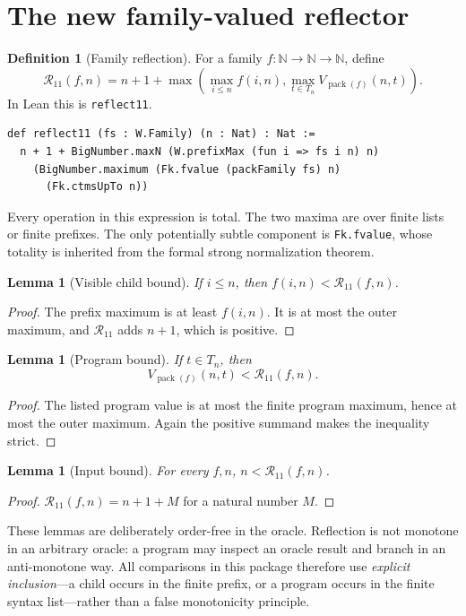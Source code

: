 \documentclass[11pt]{article}
\newtheorem{lemma}[theorem]{Lemma}
\theoremstyle{definition}
\newtheorem{definition}[theorem]{Definition}
\theoremstyle{remark}
\newcommand{\N}{\mathbb{N}}
\newcommand{\code}[1]{\texttt{#1}}
\newcommand{\R}{\mathcal{R}_{11}}
\begin{document}
\section{The new family-valued reflector}

\begin{definition}[Family reflection]
For a family $f:\N\to\N\to\N$, define
\[
  \R(f,n)=n+1+
  \max\left(
    \max_{i\le n} f(i,n),
    \max_{t\in T_n} V_{\operatorname{pack}(f)}(n,t)
  \right).
\]
In Lean this is \code{reflect11}.
\end{definition}

\begin{lstlisting}
def reflect11 (fs : W.Family) (n : Nat) : Nat :=
  n + 1 + BigNumber.maxN (W.prefixMax (fun i => fs i n) n)
    (BigNumber.maximum (Fk.fvalue (packFamily fs) n)
      (Fk.ctmsUpTo n))
\end{lstlisting}

Every operation in this expression is total.  The two maxima are over finite
lists or finite prefixes.  The only potentially subtle component is
\code{Fk.fvalue}, whose totality is inherited from the formal strong
normalization theorem.

\begin{lemma}[Visible child bound]
If $i\le n$, then $f(i,n)<\R(f,n)$.
\end{lemma}
\begin{proof}
The prefix maximum is at least $f(i,n)$.  It is at most the outer maximum, and
$\R$ adds $n+1$, which is positive.
\end{proof}

\begin{lemma}[Program bound]
If $t\in T_n$, then
\[
  V_{\operatorname{pack}(f)}(n,t)<\R(f,n).
\]
\end{lemma}
\begin{proof}
The listed program value is at most the finite program maximum, hence at most
the outer maximum.  Again the positive summand makes the inequality strict.
\end{proof}

\begin{lemma}[Input bound]
For every $f,n$, $n<\R(f,n)$.
\end{lemma}
\begin{proof}
$\R(f,n)=n+1+M$ for a natural number $M$.
\end{proof}

These lemmas are deliberately order-free in the oracle.  Reflection is not
monotone in an arbitrary oracle: a program may inspect an oracle result and
branch in an anti-monotone way.  All comparisons in this package therefore use
\emph{explicit inclusion}---a child occurs in the finite prefix, or a program
occurs in the finite syntax list---rather than a false monotonicity principle.
\end{document}
